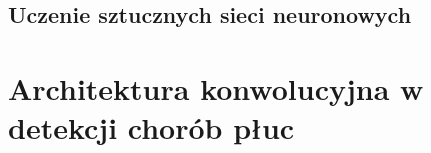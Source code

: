 \documentclass{article}
\begin{document}
\subsection{Uczenie sztucznych sieci neuronowych}



\section{Architektura konwolucyjna w detekcji chorób płuc}





	
\end{document}
